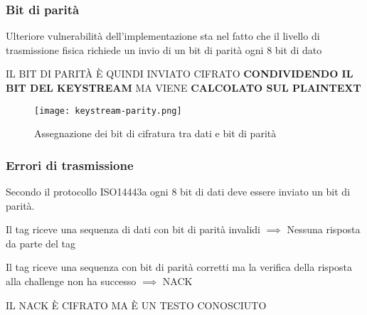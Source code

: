 \begin{frame}
    \frametitle{Bit di parità}
    \label{sec:parity-enc}
    Ulteriore vulnerabilità dell'implementazione sta nel fatto che il livello di trasmissione fisica richiede 
    un invio di un bit di parità ogni 8 bit di dato \pause

    IL BIT DI PARITÀ È QUINDI INVIATO CIFRATO \textbf{CONDIVIDENDO IL BIT DEL KEYSTREAM} MA VIENE \textbf{CALCOLATO SUL PLAINTEXT}\cite{Courtois2009TheDS}\pause

    \begin{figure}
        \centering
        \texttt{[image: keystream-parity.png]}
        \caption{Assegnazione dei bit di cifratura tra dati e bit di parità}
        \label{fig:keystream-parity}
    \end{figure}
\end{frame}

\begin{frame}
    \frametitle{Errori di trasmissione}
    \label{sec:parity-bit-vuln}
    Secondo il protocollo ISO14443a ogni 8 bit di dati deve essere inviato un bit di parità.\pause

    Il tag riceve una sequenza di dati con bit di parità invalidi $\implies$ Nessuna risposta da parte del tag\pause

    Il tag riceve una sequenza con bit di parità corretti ma la verifica della risposta alla challenge non ha successo $\implies$ NACK\pause

    {\large IL NACK È CIFRATO MA È UN TESTO CONOSCIUTO}
\end{frame}
\note{
}